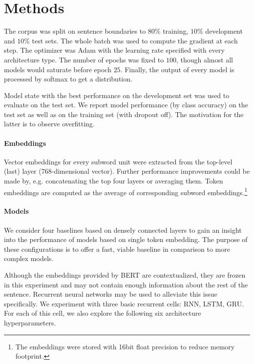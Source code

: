 \documentclass[11pt,a4paper]{article}
\begin{document}
\section{Methods}

The corpus was split on sentence boundaries to $80\%$ training, $10\%$ development and $10\%$ test sets. The whole batch was used to compute the gradient at each step. The optimizer was Adam \cite{adam} with the learning rate specified with every architecture type. The number of epochs was fixed to $100$, though almost all models would saturate before epoch $25$. Finally, the output of every model is processed by softmax to get a distribution.

Model state with the best performance on the development set was used to evaluate on the test set. We report model performance (by class accuracy) on the test set as well as on the training set (with dropout off). The motivation for the latter is to observe overfitting.

\paragraph{Embeddings}

Vector embeddings for every subword unit were extracted from the top-level (last) layer (768-dimensional vector). Further performance improvements could be made by, e.g. concatenating the top four layers or averaging them.
Token embeddings are computed as the average of corresponding subword embeddings.\footnote{
The embeddings were stored with 16bit float precision to reduce memory footprint.}

\paragraph{Models}

We consider four baselines based on densely connected layers to gain an insight into the performance of models based on single token embedding. The purpose of these configurations is to offer a fast, viable baseline in comparison to more complex models.

Although the embeddings provided by BERT are contextualized, they are frozen in this experiment and may not contain enough information about the rest of the sentence. Recurrent neural networks may be used to alleviate this issue specifically. We experiment with three basic recurrent cells: RNN, LSTM, GRU. For each of this cell, we also explore the following six architecture hyperparameters.
\end{document}

